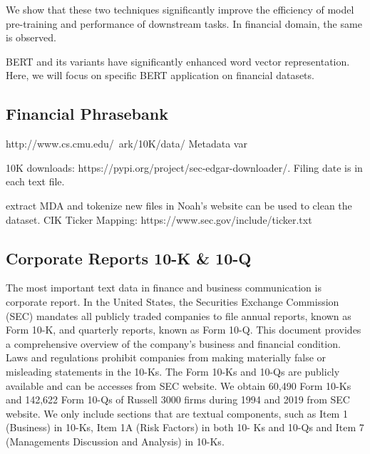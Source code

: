 \documentclass[11pt]{article}
\begin{document}
We show that these two techniques significantly improve the efficiency of
model pre-training and performance of downstream tasks. In financial
domain, the same is observed.

BERT and its variants have significantly enhanced word vector representation. Here, we will focus on specific BERT application on financial
datasets.


\subsection{Financial Phrasebank}


http://www.cs.cmu.edu/~ark/10K/data/
Metadata var

10K downloads: https://pypi.org/project/sec-edgar-downloader/. Filing
date is in each text file.

extract MDA and tokenize new files in Noah's website can be used to clean the dataset.
CIK Ticker Mapping: https://www.sec.gov/include/ticker.txt



\subsection{Corporate Reports 10-K \& 10-Q} The most important text data in finance and business communication is corporate report. In the United States,
the Securities Exchange Commission (SEC) mandates all publicly traded companies to file annual
reports, known as Form 10-K, and quarterly reports, known as Form 10-Q. This document provides a comprehensive overview of the company’s
business and financial condition. Laws and regulations prohibit companies from making materially
false or misleading statements in the 10-Ks. The
Form 10-Ks and 10-Qs are publicly available and can be accesses from
SEC website. We obtain 60,490 Form 10-Ks and 142,622
Form 10-Qs of Russell 3000 firms during 1994 and
2019 from SEC website. We only include sections that are textual components, such as Item 1 (Business) in 10-Ks, Item 1A (Risk Factors) in both 10-
Ks and 10-Qs and Item 7 (Managements Discussion and Analysis) in 10-Ks.




\end{document}
